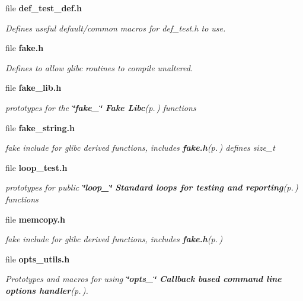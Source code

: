 \begin{CompactItemize}
\item 
file {\bf def\_\-test\_\-def.h}
\begin{CompactList}\small\item\em Defines useful default/common macros for def\_\-test.h to use. \item\end{CompactList}

\item 
file {\bf fake.h}
\begin{CompactList}\small\item\em Defines to allow glibc routines to compile unaltered. \item\end{CompactList}

\item 
file {\bf fake\_\-lib.h}
\begin{CompactList}\small\item\em prototypes for the {\bf \char`\"{}fake\_\-\char`\"{} Fake Libc}{\rm (p.\,\pageref{group__fake__lib})} functions \item\end{CompactList}

\item 
file {\bf fake\_\-string.h}
\begin{CompactList}\small\item\em fake include for glibc derived functions, includes {\bf fake.h}{\rm (p.\,\pageref{fake_8h})} defines size\_\-t \item\end{CompactList}

\item 
file {\bf loop\_\-test.h}
\begin{CompactList}\small\item\em prototypes for public {\bf \char`\"{}loop\_\-\char`\"{} Standard loops for testing and reporting}{\rm (p.\,\pageref{group__loop__test})} functions \item\end{CompactList}

\item 
file {\bf memcopy.h}
\begin{CompactList}\small\item\em fake include for glibc derived functions, includes {\bf fake.h}{\rm (p.\,\pageref{fake_8h})} \item\end{CompactList}

\item 
file {\bf opts\_\-utils.h}
\begin{CompactList}\small\item\em Prototypes and macros for using {\bf \char`\"{}opts\_\-\char`\"{} Callback based command line options handler}{\rm (p.\,\pageref{group__opts})}. \item\end{CompactList}


\end{CompactItemize}

